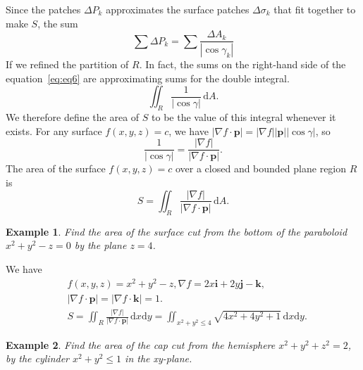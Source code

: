 \documentclass[a4paper,12pt]{article}
\newtheorem{example}{Example}             %
\begin{document}
\begin{CJK}{UTF8}{gbsn}
Since the patches $\Delta P_k $ approximates the surface patches $\Delta \sigma_k$
that fit together to make $S$, the sum 
\begin{equation}
    \sum \Delta P_k = \sum \frac{\Delta A_k}{\left|\cos \gamma_k\right|}
    \label{eq:eq6}
\end{equation}
If we refined the partition of $R$. In fact, the sums on the right-hand 
side of the equation~\ref{eq:eq6} are approximating sums for the 
double integral.
\begin{equation}
    \iint_R \frac{1}{\left|\cos \gamma \right|}\, \mathrm{d}A.
    \label{eq:eq7}
\end{equation}
We therefore define the area of $S$ to be the value of this integral 
whenever it exists. For any surface $f(x,y,z) = c$, we have $\displaystyle
\left|\nabla f \cdot \bm{p}\right| = \left|\nabla f\right| \left|\bm{p}\right|
\left|\cos \gamma\right|$, so
\[
    \frac{1}{\left|\cos \gamma\right|} = \frac{\left|\nabla f\right|}{\left|\nabla f \cdot \bm{p}\right|}.
\]
The area of the surface $f(x,y,z) = c$ over a closed and bounded plane 
region $R$ is 
\begin{equation}
    S = \iint_R \frac{\left|\nabla f\right|}{\left|\nabla f \cdot \bm{p}\right|}
       \,\mathrm{d}A.
    \label{eq:eq8}
\end{equation}

\begin{example}
    Find the area of the surface cut from the bottom of the paraboloid 
    $x^2 + y^2 -z =0$ by the plane $z=4$.
\end{example}

We have 
\[
    \begin{split}
        &f(x,y,z) = x^2 + y^2 - z,
    \nabla f = 2x\bm{i} + 2y\bm{j}  - \bm{k},\\
        &\left|\nabla f \cdot \bm{p} \right| = \left|\nabla f \cdot \bm{k}\right| = 1.\\
        & S = \iint_R \frac{\left|\nabla f \right|}{\left|\nabla f \cdot \bm{p}\right |}\, \mathrm{d}x\mathrm{d}y
            = \iint_{x^2 + y^2 \le 4} \sqrt{4x^2 + 4y^2 + 1}\,\mathrm{d}x\mathrm{d}y.
    \end{split}
    \]
\begin{example}
    Find the area of the cap cut from the hemisphere $x^2 + y^2 +z^2 = 2$, 
    by the cylinder $x^2 + y^2 \le 1$ in the xy-plane.
\end{example}


\end{CJK}
\end{document}
